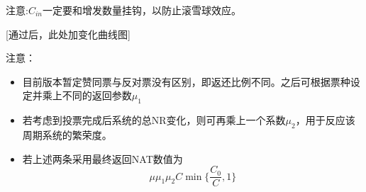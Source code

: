 注意:$C_{in}$一定要和增发数量挂钩，以防止滚雪球效应。	

\begin{comment}
具体数额为
$$\mu C \min \{\frac{C_0}{C},1\}$$
其中$\mu>1$为激励系数，可选取$\mu=1.1$。$C$为用户此阶段（一个增发周期内）投票花费（即烧毁的）NAT总数目，$C_0$为预期希望用户投出的NAT数目，每个用户对应不同的$C_0$，一般而言选取$C_0=\lambda f(x_1)$，即我们希望用户把此阶段增发的NAT用于投票，而不推荐用户一次投出过多的票。

对于用户而言，假设他一个阶段内用$C$枚NAT进行投票且$C \leq C_0$，则其NAT的变化量为
$$\mu C \min \{\frac{C_0}{C},1\}-C = \mu C_0-C$$
上式随$C$递减。这意味着对于一个利益最大化的用户而言他的最优策略为投出$C_0$票。如若项目对其意义重大，需要投出大量NAT，则有可能$\mu C_0-C <0$，相当于该用户要“动老本”进行投票。

若$C < C_0$，则其NAT的变化量为

$$\mu C \min \{\frac{C_0}{C},1\}-C = (\mu-1)C$$
上式随$C$递增，这意味着最优策略同样是投出$C_0$票。当投票数目较少时仍能获得收益但相对投$C_0$而言较少。

\end{comment}
[通过后，此处加变化曲线图]

注意：
\begin{itemize}
\item 目前版本暂定赞同票与反对票没有区别，即返还比例不同。之后可根据票种设定并乘上不同的返回参数$\mu_1$
\item 若考虑到投票完成后系统的总NR变化，则可再乘上一个系数$\mu_2$，用于反应该周期系统的繁荣度。
\item 若上述两条采用最终返回NAT数值为
$$ \mu\mu_1\mu_2 C \min \{\frac{C_0}{C},1\}$$
\end{itemize}


